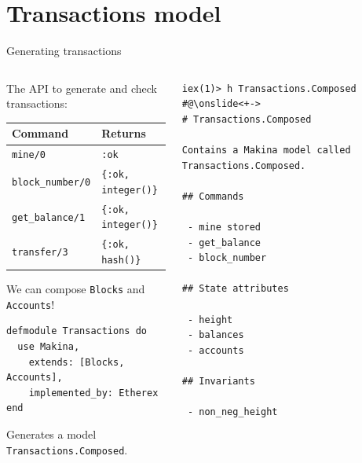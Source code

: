 \documentclass[aspectratio=169, 10pt]{beamer}
\begin{document}
\section{Transactions model}
\label{sec:orge300709}
\begin{frame}[label={sec:org99040a4},fragile]{Generating transactions}
 \begin{columns}
\begin{column}{0.48\columnwidth}
\onslide<+->
\onslide<+->
The API to generate and check transactions:
\onslide<+->
\begin{center}
\begin{tabular}{ll}
Command & Returns\\
\hline
\texttt{mine/0} & \texttt{:ok}\\
\texttt{block\_number/0} & \texttt{\{:ok, integer()\}}\\
\texttt{get\_balance/1} & \texttt{\{:ok, integer()\}}\\
\texttt{transfer/3} & \texttt{\{:ok, hash()\}}\\
\end{tabular}
\end{center}
\onslide<+->
We can compose \texttt{Blocks} and \texttt{Accounts}!
\onslide<+->
\lstset{language=elixir,label= ,caption= ,captionpos=b,numbers=none,style=display}
\begin{lstlisting}
defmodule Transactions do
  use Makina,
    extends: [Blocks, Accounts],
    implemented_by: Etherex
end
\end{lstlisting}
\onslide<+->
Generates a model \texttt{Transactions.Composed}.
\end{column}

\begin{column}{0.48\columnwidth}
\onslide<+->
\lstset{language=bash,label= ,caption= ,captionpos=b,numbers=none,style=shell}
\begin{lstlisting}
iex(1)> h Transactions.Composed
#@\onslide<+->
# Transactions.Composed

Contains a Makina model called Transactions.Composed.

## Commands

 - mine stored
 - get_balance
 - block_number

## State attributes

 - height
 - balances
 - accounts

## Invariants

 - non_neg_height

\end{lstlisting}
\end{column}
\end{columns}
\end{frame}
\end{document}
